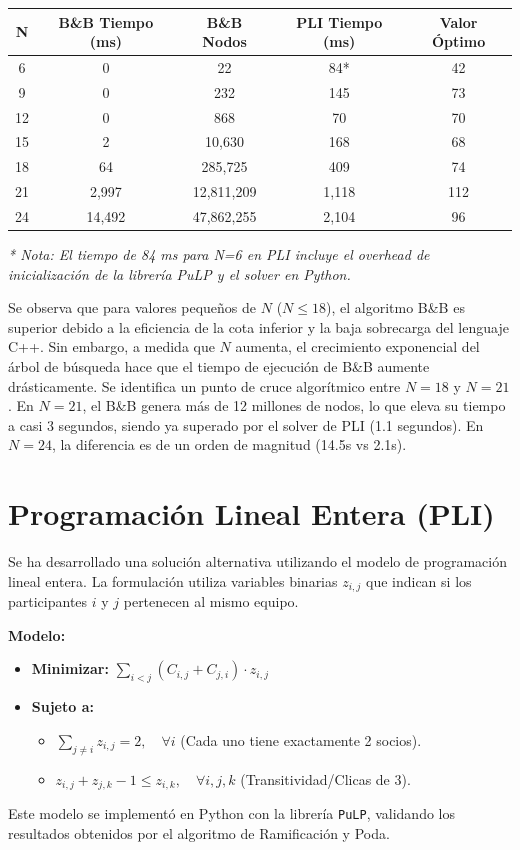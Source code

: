 \documentclass[a4paper,11pt]{article}
\begin{document}
\begin{center}
\begin{tabular}{|c|c|c|c|c|}
\hline
\textbf{N} & \textbf{B\&B Tiempo (ms)} & \textbf{B\&B Nodos} & \textbf{PLI Tiempo (ms)} & \textbf{Valor Óptimo} \\ \hline
6 & 0 & 22 & 84* & 42 \\ \hline
9 & 0 & 232 & 145 & 73 \\ \hline
12 & 0 & 868 & 70 & 70 \\ \hline
15 & 2 & 10,630 & 168 & 68 \\ \hline
18 & 64 & 285,725 & 409 & 74 \\ \hline
21 & 2,997 & 12,811,209 & 1,118 & 112 \\ \hline
24 & 14,492 & 47,862,255 & 2,104 & 96 \\ \hline
\end{tabular}
\end{center}

\textit{* Nota: El tiempo de 84 ms para N=6 en PLI incluye el overhead de inicialización de la librería PuLP y el solver en Python.}

Se observa que para valores pequeños de $N$ ($N \le 18$), el algoritmo B\&B es superior debido a la eficiencia de la cota inferior y la baja sobrecarga del lenguaje C++. Sin embargo, a medida que $N$ aumenta, el crecimiento exponencial del árbol de búsqueda hace que el tiempo de ejecución de B\&B aumente drásticamente. Se identifica un punto de cruce algorítmico entre $N=18$ y $N=21$. En $N=21$, el B\&B genera más de 12 millones de nodos, lo que eleva su tiempo a casi 3 segundos, siendo ya superado por el solver de PLI (1.1 segundos). En $N=24$, la diferencia es de un orden de magnitud (14.5s vs 2.1s).

\section{Programación Lineal Entera (PLI)}
Se ha desarrollado una solución alternativa utilizando el modelo de programación lineal entera. La formulación utiliza variables binarias $z_{i,j}$ que indican si los participantes $i$ y $j$ pertenecen al mismo equipo.

\textbf{Modelo:}
\begin{itemize}
    \item \textbf{Minimizar:} $\sum_{i<j} (C_{i,j} + C_{j,i}) \cdot z_{i,j}$
    \item \textbf{Sujeto a:}
    \begin{itemize}
        \item $\sum_{j \neq i} z_{i,j} = 2, \quad \forall i$ (Cada uno tiene exactamente 2 socios).
        \item $z_{i,j} + z_{j,k} - 1 \leq z_{i,k}, \quad \forall i,j,k$ (Transitividad/Clicas de 3).
    \end{itemize}
\end{itemize}
Este modelo se implementó en Python con la librería \texttt{PuLP}, validando los resultados obtenidos por el algoritmo de Ramificación y Poda.
\end{document}
